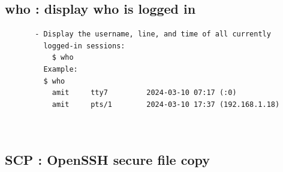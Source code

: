 \documentclass[a4paper,12pt]{article}
\begin{document}
\subsection{who : display who is logged in}
\begin{verbatim}
       - Display the username, line, and time of all currently 
         logged-in sessions:
           $ who
         Example: 
         $ who
           amit     tty7         2024-03-10 07:17 (:0)
           amit     pts/1        2024-03-10 17:37 (192.168.1.18)

       
\end{verbatim}




\subsection{SCP : OpenSSH secure file copy}
\end{document}
